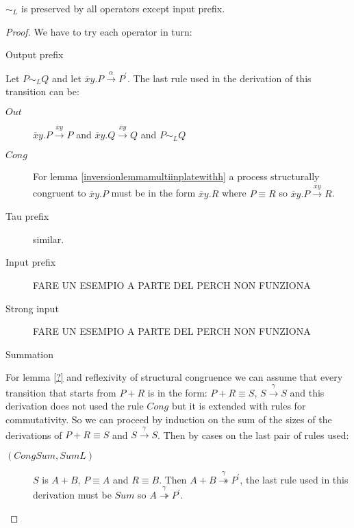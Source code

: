 \begin{proposition}
  $\sim_{L}$ is preserved by all operators except input prefix.
  \begin{proof}
    We have to try each operator in turn:
    \begin{description}
      \item[Output prefix]
    \end{description}
	Let $P \sim_{L} Q$ and let $\overline{x}y.P \xrightarrow{\alpha} P^{'}$. The last rule used in the derivation of this transition can be:
	\begin{description}
	  \item[$Out$]
	    $\overline{x}y.P \xrightarrow{\overline{x}y} P$ and $\overline{x}y.Q \xrightarrow{\overline{x}y} Q$ and $P \sim_{L} Q$
	  \item[$Cong$]
	    For lemma \ref{inversionlemmamultiinplatewithh} a process structurally congruent to $\overline{x}y.P$ must be in the form $\overline{x}y.R$ where $P \equiv R$ so $\overline{x}y.P \xrightarrow{\overline{x}y} R$.
	\end{description}
    \begin{description}
      \item[Tau prefix] similar.
    \end{description}
    \begin{description}
      \item[Input prefix] FARE UN ESEMPIO A PARTE DEL PERCH NON FUNZIONA
    \end{description}
    \begin{description}
      \item[Strong input] FARE UN ESEMPIO A PARTE DEL PERCH NON FUNZIONA	
    \end{description}
    \begin{description}
      \item[Summation] 
    \end{description}
	For lemma \ref{?} and reflexivity of structural congruence we can assume that every transition that starts from $P+R$ is in the form: $P+R\equiv S$, $S \xrightarrow{\gamma}S$ and this derivation does not used the rule $Cong$ but it is extended with rules for commutativity. So we can proceed by induction on the sum of the sizes of the derivations of $P+R\equiv S$ and $S \xrightarrow{\gamma}S$. Then by cases on the last pair of rules used:
	    \begin{description}
	      \item[$(CongSum, SumL)$]
		$S$ is $A+B$, $P \equiv A$ and $R \equiv B$. Then $A+B \stackrel{\gamma}{\twoheadrightarrow} P^{'}$, the last rule used in this derivation must be $Sum$ so $A \stackrel{\gamma}{\twoheadrightarrow} P^{'}$. 

\end{description}
\end{proof}
\end{proposition}
